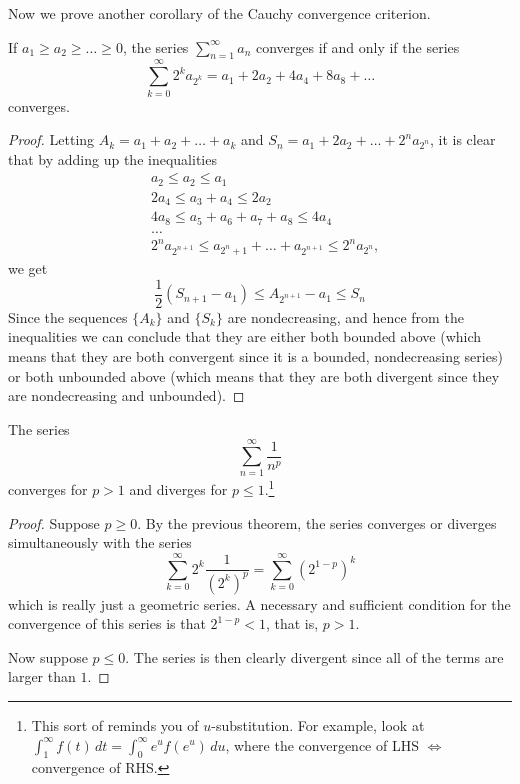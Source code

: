   Now we prove another corollary of the Cauchy convergence criterion.   

  \begin{theorem}
    If $a_1 \geq a_2 \geq \ldots \geq 0$, the series $\sum_{n=1}^\infty a_n$ converges if and only if the series 
    \begin{equation}
      \sum_{k=0}^\infty 2^k a_{2^k} = a_1 + 2 a_2 + 4a_4 + 8a_8 + \ldots 
    \end{equation}
    converges. 
  \end{theorem}
  \begin{proof}
    Letting $A_k = a_1 + a_2 + \ldots + a_k$ and $S_n = a_1 + 2a_2 + \ldots + 2^n a_{2^n}$, it is clear that by adding up the inequalities
    \begin{align*}
      & a_2 \leq a_2 \leq a_1 \\
      & 2a_4 \leq a_3 + a_4 \leq 2a_2 \\
      & 4a_8 \leq a_5 + a_6 + a_7 + a_8 \leq 4a_4 \\
      & \ldots \\
      & 2^n a_{2^{n+1}} \leq a_{2^n + 1} + \ldots + a_{2^{n+1}} \leq 2^n a_{2^n}, 
    \end{align*}
    we get
    \begin{equation}
      \frac{1}{2}(S_{n+1} - a_1) \leq A_{2^{n+1}} - a_1 \leq S_n
    \end{equation}
    Since the sequences $\{A_k\}$ and $\{S_k\}$ are nondecreasing, and hence from the inequalities we can conclude that they are either both bounded above (which means that they are both convergent since it is a bounded, nondecreasing series) or both unbounded above (which means that they are both divergent since they are nondecreasing and unbounded). 
  \end{proof}

  \begin{corollary}
    The series 
    \begin{equation}
      \sum_{n=1}^\infty \frac{1}{n^p}
    \end{equation}
    converges for $p>1$ and diverges for $p \leq 1$.\footnote{This sort of reminds you of $u$-substitution. For example, look at $\int_1^\infty f(t) \,dt = \int_0^\infty e^u f(e^u)\,du$, where the convergence of LHS $\iff$ convergence of RHS.}
  \end{corollary}
  \begin{proof}
    Suppose $p\geq 0$. By the previous theorem, the series converges or diverges simultaneously with the series 
    \begin{equation}
      \sum_{k=0}^\infty 2^k \frac{1}{(2^k)^p} = \sum_{k=0}^\infty (2^{1-p})^k
    \end{equation}
    which is really just a geometric series. A necessary and sufficient condition for the convergence of this series is that $2^{1-p} < 1$, that is, $p>1$. 

    Now suppose $p \leq 0$. The series is then clearly divergent since all of the terms are larger than $1$. 
  \end{proof}

